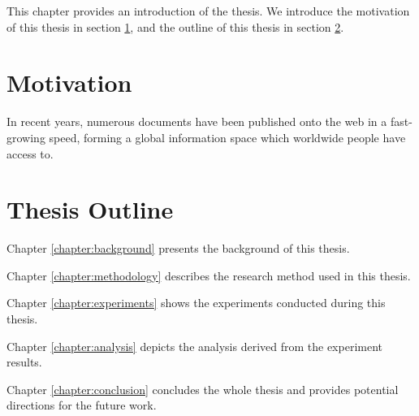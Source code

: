

This chapter provides an introduction of the thesis. We introduce the motivation of this thesis in section \ref{section:motivation}, and the outline of this thesis in section \ref{section:thesis outline}.


\section{Motivation} \label{section:motivation}
In recent years, numerous documents have been published onto the web in a fast-growing speed, forming a global information space which worldwide people have access to. 

\section{Thesis Outline} \label{section:thesis outline}

Chapter \ref{chapter:background} presents the background of this thesis.

Chapter \ref{chapter:methodology} describes the research method used in this thesis.

Chapter \ref{chapter:experiments} shows the experiments conducted during this thesis.

Chapter \ref{chapter:analysis} depicts the analysis derived from the experiment results.

Chapter \ref{chapter:conclusion} concludes the whole thesis and provides potential directions for the future work.